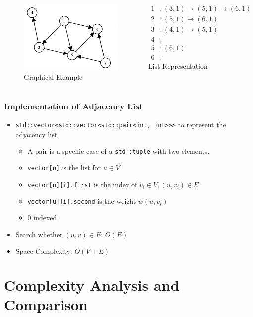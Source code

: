 \documentclass{beamer}
\begin{document}
\begin{frame}
	\begin{columns}
	\begin{figure}
		\includegraphics[scale=0.5]{./pict/exampleGraph.png}
		\caption{Graphical Example}
	\end{figure}

	\begin{align*}
		1 &: (3, 1) \rightarrow (5, 1) \rightarrow (6, 1)\\
		2 &: (5, 1) \rightarrow (6, 1) \\
		3 &: (4, 1) \rightarrow (5, 1) \\
		4 &: \\
		5 &: (6, 1)\\
		6 &: 
	\end{align*}			
	\centering List Representation
			
	\end{columns}
\end{frame}

\begin{frame}
	\frametitle{Implementation of Adjacency List}
	\begin{itemize}
		\item \texttt{std::vector<std::vector<std::pair<int, int>>>} to represent the adjacency list
		\begin{itemize}
			\item A pair is a specific case of a \texttt{std::tuple} with two elements.
			\item \texttt{vector[u]} is the list for \( u \in V \) 
			\item \texttt{vector[u][i].first} is the index of \( v_i \in V, (u, v_i) \in E \) 
			\item \texttt{vector[u][i].second} is the weight \( w(u, v_i) \) 	
			\item 0 indexed
		\end{itemize}
		\item Search whether \( (u, v) \in E \): \( O(E) \)  
		\item Space Complexity: \( O(V+E) \) 
	\end{itemize}
\end{frame}

\section{Complexity Analysis and Comparison}
\begin{frame}
	
\end{frame}
\end{document}
